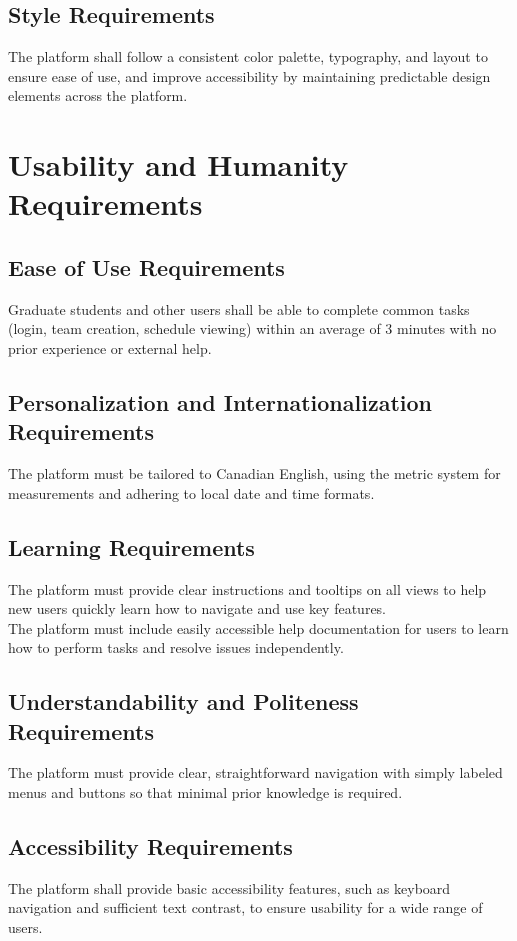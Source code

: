 \documentclass[12pt]{article}
\begin{document}
\subsection{Style Requirements}
The platform shall follow a consistent color palette, typography, and layout to ensure ease of use, and improve accessibility by maintaining predictable design elements across the platform.

\section{Usability and Humanity Requirements}
\subsection{Ease of Use Requirements}
Graduate students and other users shall be able to complete common tasks (login, team creation, schedule viewing) within an average of 3 minutes with no prior experience or external help.

\subsection{Personalization and Internationalization Requirements}
The platform must be tailored to Canadian English, using the metric system for measurements and adhering to local date and time formats.

\subsection{Learning Requirements}
The platform must provide clear instructions and tooltips on all views to help new users quickly learn how to navigate and use key features.\\

\noindent The platform must include easily accessible help documentation for users to learn how to perform tasks and resolve issues independently.


\subsection{Understandability and Politeness Requirements}
The platform must provide clear, straightforward navigation with simply labeled menus and buttons so that minimal prior knowledge is required.

\subsection{Accessibility Requirements}
The platform shall provide basic accessibility features, such as keyboard navigation and sufficient text contrast, to ensure usability for a wide range of users.
\end{document}
